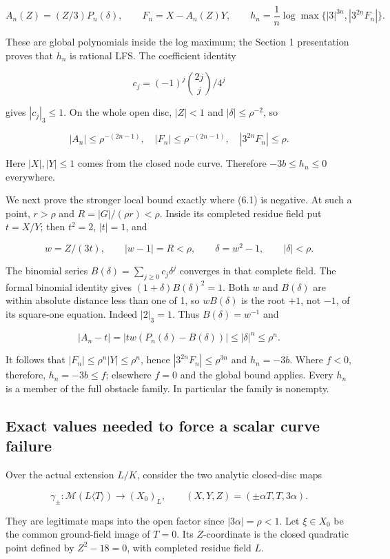 \documentclass[11pt,a4paper]{article}
\begin{document}
\[
A_n(Z)=(Z/3)P_n(\delta),\qquad
F_n=X-A_n(Z)Y,\qquad
h_n=\frac1n\log\max\{|3|^{3n},|3^{2n}F_n|\}. \tag{6.2}
\]

These are global polynomials inside the log maximum; the Section 1 presentation proves that \(h_n\) is rational LFS. The coefficient identity

\[
c_j=(-1)^j\binom{2j}{j}/4^j
\]

gives \(|c_j|_3\leq1\). On the whole open disc, \(|Z|<1\) and \(|\delta|\leq\rho^{-2}\), so

\[
|A_n|\leq\rho^{-(2n-1)},\quad
|F_n|\leq\rho^{-(2n-1)},\quad
|3^{2n}F_n|\leq\rho.
\]

Here \(|X|,|Y|\leq1\) comes from the closed node curve. Therefore \(-3b\leq h_n\leq0\) everywhere.

We next prove the stronger local bound exactly where (6.1) is negative. At such a point, \(r>\rho\) and \(R=|G|/(\rho r)<\rho\). Inside its completed residue field put \(t=X/Y\); then \(t^2=2\), \(|t|=1\), and

\[
w=Z/(3t),\qquad |w-1|=R<\rho,
\qquad \delta=w^2-1,\qquad |\delta|<\rho.
\]

The binomial series \(B(\delta)=\sum_{j\geq0}c_j\delta^j\) converges in that complete field. The formal binomial identity gives \((1+\delta)B(\delta)^2=1\). Both \(w\) and \(B(\delta)\) are within absolute distance less than one of 1, so \(wB(\delta)\) is the root \(+1\), not \(-1\), of its square-one equation. Indeed \(|2|_3=1\). Thus \(B(\delta)=w^{-1}\) and

\[
|A_n-t|=|tw(P_n(\delta)-B(\delta))|
\leq |\delta|^n\leq\rho^n.
\]

It follows that \(|F_n|\leq\rho^n|Y|\leq\rho^n\), hence \(|3^{2n}F_n|\leq\rho^{3n}\) and \(h_n=-3b\). Where \(f<0\), therefore, \(h_n=-3b\leq f\); elsewhere \(f=0\) and the global bound applies. Every \(h_n\) is a member of the full obstacle family. In particular the family is nonempty.

\subsection*{Exact values needed to force a scalar curve failure}

Over the actual extension \(L/K\), consider the two analytic closed-disc maps

\[
\gamma_\pm:\mathcal M(L\langle T\rangle)\to (X_0)_L,
\qquad (X,Y,Z)=(\pm\alpha T,T,3\alpha).
\]

They are legitimate maps into the open factor since \(|3\alpha|=\rho<1\). Let \(\xi\in X_0\) be the common ground-field image of \(T=0\). Its \(Z\)-coordinate is the closed quadratic point defined by \(Z^2-18=0\), with completed residue field \(L\).
\end{document}
